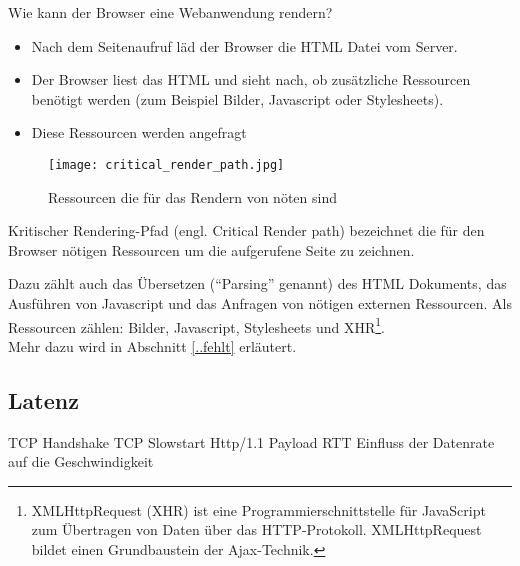 			Wie kann der Browser eine Webanwendung rendern?

			\begin{itemize}
				\item Nach dem Seitenaufruf läd der Browser die HTML Datei vom Server.
				\item Der Browser liest das HTML und sieht nach, ob zusätzliche Ressourcen benötigt werden (zum Beispiel Bilder, Javascript oder Stylesheets).
				\item Diese Ressourcen werden angefragt 
			\end{itemize}

			\begin{figure}[htbp]
				\begin{center}
					\texttt{[image: critical\_render\_path.jpg]}
					\caption{Ressourcen die für das Rendern von nöten sind}
					\label{fig:critical_render_path}
				\end{center}
			\end{figure}

			Kritischer Rendering-Pfad (engl. Critical Render path) bezeichnet die für den Browser nötigen Ressourcen um die aufgerufene Seite zu zeichnen.

			Dazu zählt auch das Übersetzen ("`Parsing"' genannt) des HTML Dokuments, das Ausführen von Javascript und das Anfragen von nötigen externen Ressourcen. Als Ressourcen zählen: Bilder, Javascript, Stylesheets und XHR\footnote{XMLHttpRequest (XHR) ist eine Programmierschnittstelle für JavaScript zum Übertragen von Daten über das HTTP-Protokoll. XMLHttpRequest bildet einen Grundbaustein der Ajax-Technik.\autocite{xhr15}}.\\

			Mehr dazu wird in Abschnitt \ref{..fehlt} erläutert.

	

	\subsection{Latenz}
	\label{sub:latenz}
		TCP Handshake
		TCP Slowstart
		Http/1.1
		Payload
		RTT
		Einfluss der Datenrate auf die Geschwindigkeit

		

	
